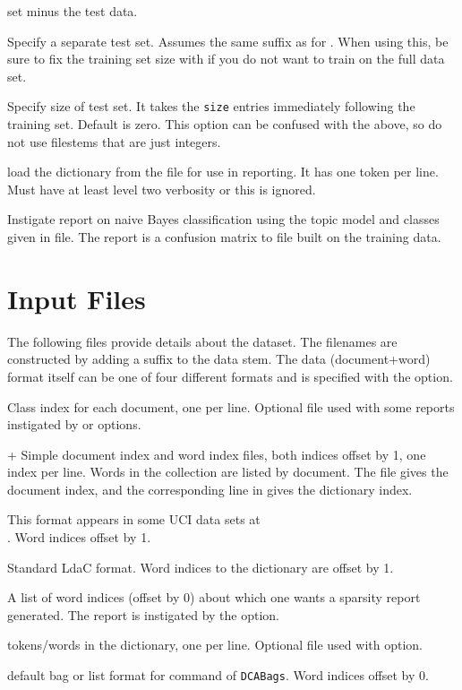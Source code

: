 \documentclass[a4paper,english]{article}
\begin{document}
\begin{Description}
set minus the test data.
\item[\OptArg{-T}{filestem}]  Specify a separate test set.  
Assumes the same suffix as for .
When using this, be sure to fix the training set size with 
 if you do not want to train on the full
data set.
\item[\OptArg{-T}{size}]  Specify size of test set.  It takes the
\texttt{size} entries immediately following the training set. 
Default is zero.  This option can be confused with the above, so do not use 
filestems that are just integers.
\item[\Opt{-V}]  load the dictionary from the
 file for use in reporting.  It has one token per line.
Must have at least level two verbosity or this is ignored.
\item[\Opt{-X}]  Instigate report on naive Bayes classification
using the topic model and classes given in  file.
The report is a confusion matrix to file  built on
the training data.
\end{Description}

\section{Input Files}

The following files provide details about the dataset.
The filenames are constructed by adding a suffix to the data stem.
The data (document+word) format itself can be one of four different
formats and is specified with the  option.
\begin{Description}\setlength{\itemsep}{0cm}
\item[\File{DataStem.class}] Class index for each document, one per line.  
Optional file used with some reports instigated by
 or  options.
\item[\File{DataStem.dit}+\File{DataStem.wit}] Simple document index and word index files, both indices offset by 1, one index per line.  
Words in the collection are listed by document.  The  file
gives the document index, and the corresponding line in 
gives the dictionary index.  
\item[\File{DataStem.docword}] This format appears in some UCI data sets
at\\.
Word indices offset by 1.
\item[\File{DataStem.ldac}] Standard LdaC format.  Word indices to the dictionary are offset by 1.
\item[\File{DataStem.smap}] A list of word indices (offset by 0)
about which one wants a sparsity report generated.
The report is instigated by the
 option.
\item[\File{DataStem.tokens}] tokens/words in the dictionary, one per line.
Optional file used with  option.
\item[\File{DataStem.txtbag}] default bag or list format for  command of \texttt{DCABags}.  Word indices offset by 0.
\end{Description}
\end{document}
